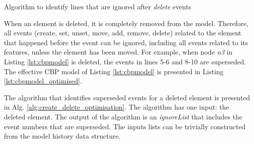 \documentclass{llncs}
\begin{document}
     \begin{algorithm}[H]
        \begin{small}
        \end{small}
        \caption{Algorithm to identify lines that are ignored after \emph{delete} events}
        \label{alg:create_delete_optimisation}
    \end{algorithm}

    When an element is deleted, it is completely removed from the model.
    Therefore, all events (create, set, unset, move, add, remove, delete) related to the element that happened before the event can be ignored, including all events related to its features, unless the element has been moved.
    For example, when node \emph{n3} in Listing \ref{lst:cbpmodel}  is deleted, the events in lines 5-6 and 8-10 are superseded.
    The effective CBP model of Listing \ref{lst:cbpmodel} is presented in Listing \ref{lst:cbpmodel_optimised}.
     
     The algorithm that identifies superseded events for a deleted element is presented in Alg. \ref{alg:create_delete_optimisation}.
    The algorithm has one input: the deleted element.
    The output of the algorithm is an \emph{ignoreList} that includes the event numbers that are superseded.
    The inputs lists can be trivially constructed from the model history data structure.
    
\end{document}
